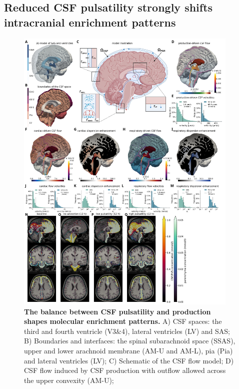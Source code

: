 \documentclass[fleqn,10pt]{wlscirep}
\begin{document}
\subsection*{Reduced CSF pulsatility strongly shifts intracranial enrichment patterns}
\begin{figure}%
\centering 
\includegraphics[width = 0.95\textwidth]{figures/figure2.png}
\caption{\textbf{The balance between CSF pulsatility and production shapes molecular enrichment patterns.}
A) CSF spaces: the third and fourth ventricle (V3\&4), lateral ventricles (LV) and SAS; 
B) Boundaries and interfaces: the spinal subarachnoid space (SSAS), upper and lower arachnoid membrane (AM-U and AM-L), pia (Pia) and lateral ventricles (LV); 
C) Schematic of the CSF flow model; 
D) CSF flow induced by CSF production with outflow allowed across the
upper convexity (AM-U); 
}
\label{fig:csf}
\end{figure}
\end{document}
